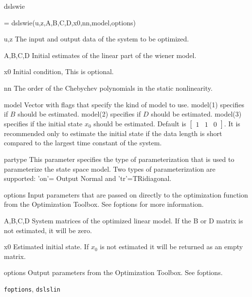 \documentclass{book}
\newcommand{\mat}[2]{\left[\begin{array}{#1}#2\end{array}\right]}
\newcommand{\foptions}{\texttt{foptions}}
\newcommand{\dslslin}{\texttt{dslslin}}
\begin{document}
\begin{command}{dslswie}
\begin{syntax} 
 = dslswie(u,z,A,B,C,D,x0,nn,model,options)
\end{syntax}
\begin{inputs}
\item[u,z] The input and output data of the system to be optimized.
\item[A,B,C,D] Initial estimates of the linear part of the wiener
  model.
\item[x0] Initial condition, This is optional.
\item[nn] The order of the Chebychev polynomials in the static
  nonlinearity.
\item[model] Vector with flags that specify the kind of model to use.
  model(1) specifies if  $B$ should be estimated.  model(2)
  specifies if  $D$ should be estimated.  model(3) specifies if
  the initial state $x_0$ should be estimated.  Default is
  $\mat{cccc}{1&1&0}$. It is recommended only to estimate the initial
  state if the data length is short compared to the largest time
  constant of the system.
\item[partype] This parameter specifies the type of parameterization 
  that is used to parameterize the state space model.
  Two types of parameterization are supported:
  'on'= Output Normal and 'tr'=TRidiagonal.
\item[options] Input parameters that are passed on directly to the
  optimization function from the Optimization Toolbox.
  See foptions for more information.
\end{inputs}
\begin{outputs}
\item[A,B,C,D] System matrices of the optimized linear model.  If the
  B or D matrix is not estimated, it will be zero.
\item[x0] Estimated initial state. If $x_0$ is not estimated it will be
  returned as an empty matrix.
\item[options] Output parameters from the Optimization Toolbox.  See
  foptions.
\end{outputs}
\begin{seealso}
{\foptions}, {\dslslin}
\end{seealso}
\end{command}%
\end{document}
